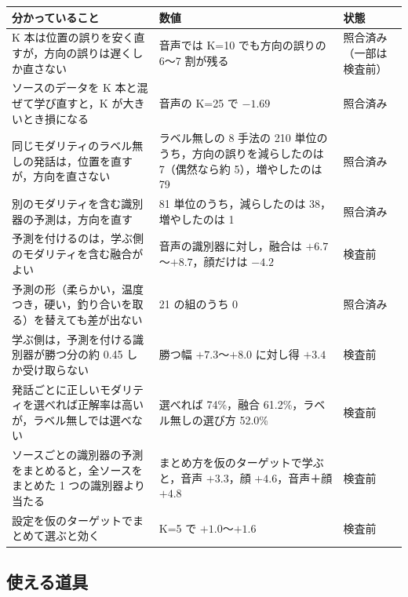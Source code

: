 \documentclass[11pt,a4paper]{ltjsarticle}
\begin{document}
\begin{center}\small
\begin{tabularx}{\linewidth}{@{}LP{40mm}P{20mm}@{}}
\toprule
分かっていること & 数値 & 状態 \\
\midrule
K 本は位置の誤りを安く直すが，方向の誤りは遅くしか直さない & 音声では K=10 でも方向の誤りの 6〜7 割が残る & 照合済み（一部は検査前） \\
ソースのデータを K 本と混ぜて学び直すと，K が大きいとき損になる & 音声の K=25 で $-1.69$ & 照合済み \\
同じモダリティのラベル無しの発話は，位置を直すが，方向を直さない & ラベル無しの 8 手法の 210 単位のうち，方向の誤りを減らしたのは 7（偶然なら約 5），増やしたのは 79 & 照合済み \\
別のモダリティを含む識別器の予測は，方向を直す & 81 単位のうち，減らしたのは 38，増やしたのは 1 & 照合済み \\
予測を付けるのは，学ぶ側のモダリティを含む融合がよい & 音声の識別器に対し，融合は $+6.7$〜$+8.7$，顔だけは $-4.2$ & 検査前 \\
予測の形（柔らかい，温度つき，硬い，釣り合いを取る）を替えても差が出ない & 21 の組のうち 0 & 照合済み \\
学ぶ側は，予測を付ける識別器が勝つ分の約 0.45 しか受け取らない & 勝つ幅 $+7.3$〜$+8.0$ に対し得 $+3.4$ & 検査前 \\
発話ごとに正しいモダリティを選べれば正解率は高いが，ラベル無しでは選べない & 選べれば 74\%，融合 61.2\%，ラベル無しの選び方 52.0\% & 検査前 \\
ソースごとの識別器の予測をまとめると，全ソースをまとめた 1 つの識別器より当たる & まとめ方を仮のターゲットで学ぶと，音声 $+3.3$，顔 $+4.6$，音声＋顔 $+4.8$ & 検査前 \\
設定を仮のターゲットでまとめて選ぶと効く & K=5 で $+1.0$〜$+1.6$ & 検査前 \\
\bottomrule
\end{tabularx}
\end{center}

\subsection{使える道具}
\end{document}
